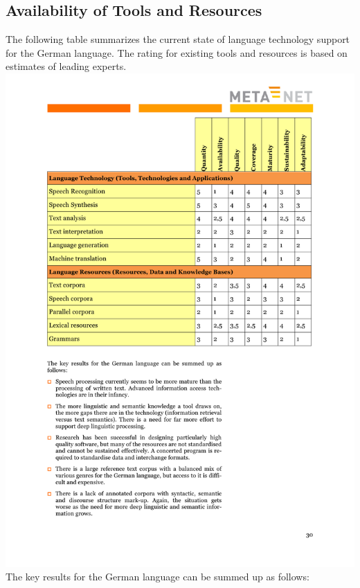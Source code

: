 \documentclass[]{../metanetpaper}
\begin{document}
	\subsection{Availability of Tools and Resources}
The following table summarizes the current state of language technology support for the German language. The rating for existing tools and resources is based on estimates of leading experts.\\
\includegraphics[scale=0.3]{media/metanet-paper2.pdf} 
The key results for the German language can be summed up as follows:
\end{document}
